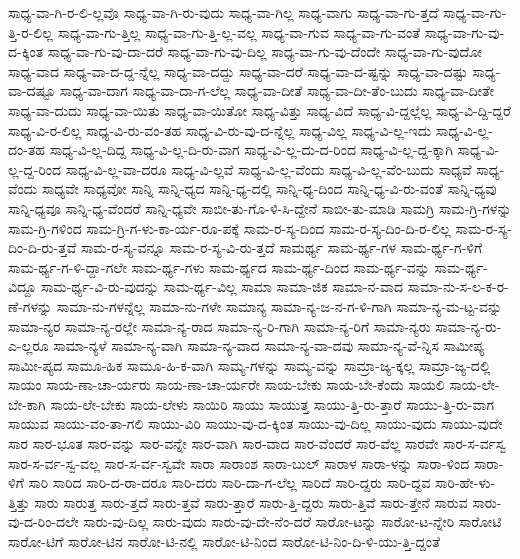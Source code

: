 {ಸಾಧ್ಯ-ವಾ-ಗಿ-ರ-ಲಿ-ಲ್ಲವೊ
ಸಾಧ್ಯ-ವಾ-ಗಿ-ರು-ವುದು
ಸಾಧ್ಯ-ವಾ-ಗಿಲ್ಲ
ಸಾಧ್ಯ-ವಾಗು
ಸಾಧ್ಯ-ವಾ-ಗು-ತ್ತದೆ
ಸಾಧ್ಯ-ವಾ-ಗು-ತ್ತಿ-ರ-ಲಿಲ್ಲ
ಸಾಧ್ಯ-ವಾ-ಗು-ತ್ತಿಲ್ಲ
ಸಾಧ್ಯ-ವಾ-ಗು-ತ್ತಿ-ಲ್ಲ-ವಲ್ಲ
ಸಾಧ್ಯ-ವಾ-ಗುವ
ಸಾಧ್ಯ-ವಾ-ಗು-ವಂತೆ
ಸಾಧ್ಯ-ವಾ-ಗು-ವು-ದ-ಕ್ಕಿಂತ
ಸಾಧ್ಯ-ವಾ-ಗು-ವು-ದಾ-ದರೆ
ಸಾಧ್ಯ-ವಾ-ಗು-ವು-ದಿಲ್ಲ
ಸಾಧ್ಯ-ವಾ-ಗು-ವು-ದೆಂದೇ
ಸಾಧ್ಯ-ವಾ-ಗು-ವುದೋ
ಸಾಧ್ಯ-ವಾದ
ಸಾಧ್ಯ-ವಾ-ದ-ದ್ದ-ನ್ನೆಲ್ಲ
ಸಾಧ್ಯ-ವಾ-ದದ್ದು
ಸಾಧ್ಯ-ವಾ-ದರೆ
ಸಾಧ್ಯ-ವಾ-ದ-ಷ್ಟನ್ನು
ಸಾಧ್ಯ-ವಾ-ದಷ್ಟು
ಸಾಧ್ಯ-ವಾ-ದಷ್ಟೂ
ಸಾಧ್ಯ-ವಾ-ದಾಗ
ಸಾಧ್ಯ-ವಾ-ದಾ-ಗ-ಲೆಲ್ಲ
ಸಾಧ್ಯ-ವಾ-ದೀತೆ
ಸಾಧ್ಯ-ವಾ-ದೀ-ತೆಂ-ಬುದು
ಸಾಧ್ಯ-ವಾ-ದೀತೇ
ಸಾಧ್ಯ-ವಾ-ದುದು
ಸಾಧ್ಯ-ವಾ-ಯಿತು
ಸಾಧ್ಯ-ವಾ-ಯಿತೋ
ಸಾಧ್ಯ-ವಿತ್ತು
ಸಾಧ್ಯ-ವಿದೆ
ಸಾಧ್ಯ-ವಿ-ದ್ದಲ್ಲೆಲ್ಲ
ಸಾಧ್ಯ-ವಿ-ದ್ದಿ-ದ್ದರೆ
ಸಾಧ್ಯ-ವಿ-ರ-ಲಿಲ್ಲ
ಸಾಧ್ಯ-ವಿ-ರು-ವಂ-ತಹ
ಸಾಧ್ಯ-ವಿ-ರು-ವು-ದ-ನ್ನೆಲ್ಲ
ಸಾಧ್ಯ-ವಿಲ್ಲ
ಸಾಧ್ಯ-ವಿ-ಲ್ಲ-ಇದು
ಸಾಧ್ಯ-ವಿ-ಲ್ಲ-ದಂ-ತಹ
ಸಾಧ್ಯ-ವಿ-ಲ್ಲ-ದಿದ್ದ
ಸಾಧ್ಯ-ವಿ-ಲ್ಲ-ದಿ-ರು-ವಾಗ
ಸಾಧ್ಯ-ವಿ-ಲ್ಲ-ದು-ದ-ರಿಂದ
ಸಾಧ್ಯ-ವಿ-ಲ್ಲ-ದ್ದ-ಕ್ಕಾಗಿ
ಸಾಧ್ಯ-ವಿ-ಲ್ಲ-ದ್ದ-ರಿಂದ
ಸಾಧ್ಯ-ವಿ-ಲ್ಲ-ವಾ-ದರೂ
ಸಾಧ್ಯ-ವಿ-ಲ್ಲವೆ
ಸಾಧ್ಯ-ವಿ-ಲ್ಲ-ವೆಂದು
ಸಾಧ್ಯ-ವಿ-ಲ್ಲ-ವೆಂ-ಬುದು
ಸಾಧ್ಯವೆ
ಸಾಧ್ಯ-ವೆಂದು
ಸಾಧ್ಯವೇ
ಸಾಧ್ಯವೋ
ಸಾನ್ನಿ
ಸಾನ್ನಿ-ಧ್ಯದ
ಸಾನ್ನಿ-ಧ್ಯ-ದಲ್ಲಿ
ಸಾನ್ನಿ-ಧ್ಯ-ದಿಂದ
ಸಾನ್ನಿ-ಧ್ಯ-ವಿ-ರು-ವಂತೆ
ಸಾನ್ನಿ-ಧ್ಯವು
ಸಾನ್ನಿ-ಧ್ಯವೂ
ಸಾನ್ನಿ-ಧ್ಯ-ವೆಂದರೆ
ಸಾನ್ನಿ-ಧ್ಯವೇ
ಸಾಬೀ-ತು-ಗೊ-ಳಿ-ಸಿ-ದ್ದೇನೆ
ಸಾಬೀ-ತು-ಮಾಡಿ
ಸಾಮಗ್ರಿ
ಸಾಮ-ಗ್ರಿ-ಗಳನ್ನು
ಸಾಮ-ಗ್ರಿ-ಗಳಿಂದ
ಸಾಮ-ಗ್ರಿ-ಗ-ಳು-ಕಾ-ರ್ಯ-ರೂ-ಪಕ್ಕೆ
ಸಾಮ-ರ-ಸ್ಯ-ದಿಂದ
ಸಾಮ-ರ-ಸ್ಯ-ದಿಂ-ದಿ-ರ-ಲಿಲ್ಲ
ಸಾಮ-ರ-ಸ್ಯ-ದಿಂ-ದಿ-ರು-ತ್ತವೆ
ಸಾಮ-ರ-ಸ್ಯ-ವನ್ನೂ
ಸಾಮ-ರ-ಸ್ಯ-ವಿ-ರು-ತ್ತದೆ
ಸಾಮರ್ಥ್ಯ
ಸಾಮ-ರ್ಥ್ಯ-ಗಳ
ಸಾಮ-ರ್ಥ್ಯ-ಗ-ಳಿಗೆ
ಸಾಮ-ರ್ಥ್ಯ-ಗ-ಳಿ-ದ್ದಾ-ಗಲೇ
ಸಾಮ-ರ್ಥ್ಯ-ಗಳು
ಸಾಮ-ರ್ಥ್ಯದ
ಸಾಮ-ರ್ಥ್ಯ-ದಿಂದ
ಸಾಮ-ರ್ಥ್ಯ-ವನ್ನು
ಸಾಮ-ರ್ಥ್ಯ-ವಿದ್ದೂ
ಸಾಮ-ರ್ಥ್ಯ-ವಿ-ರು-ವುದನ್ನು
ಸಾಮ-ರ್ಥ್ಯ-ವಿಲ್ಲ
ಸಾಮಾ
ಸಾಮಾ-ಜಿಕ
ಸಾಮಾ-ನ-ವಾದ
ಸಾಮಾ-ನು-ಸ-ಲ-ಕ-ರ-ಣೆ-ಗಳನ್ನು
ಸಾಮಾ-ನು-ಗಳನ್ನೆಲ್ಲ
ಸಾಮಾ-ನು-ಗಳೇ
ಸಾಮಾನ್ಯ
ಸಾಮಾ-ನ್ಯ-ಜ-ನ-ಗ-ಳಿ-ಗಾಗಿ
ಸಾಮಾ-ನ್ಯ-ಮ-ಟ್ಟ-ವನ್ನು
ಸಾಮಾ-ನ್ಯರ
ಸಾಮಾ-ನ್ಯ-ರಲ್ಲೇ
ಸಾಮಾ-ನ್ಯ-ರಾದ
ಸಾಮಾ-ನ್ಯ-ರಿ-ಗಾಗಿ
ಸಾಮಾ-ನ್ಯ-ರಿಗೆ
ಸಾಮಾ-ನ್ಯರು
ಸಾಮಾ-ನ್ಯ-ರು-ಎ-ಲ್ಲರೂ
ಸಾಮಾ-ನ್ಯಳೆ
ಸಾಮಾ-ನ್ಯ-ವಾಗಿ
ಸಾಮಾ-ನ್ಯ-ವಾದ
ಸಾಮಾ-ನ್ಯ-ವಾ-ದವು
ಸಾಮಾ-ನ್ಯ-ವೆ-ನ್ನಿಸ
ಸಾಮೀಪ್ಯ
ಸಾಮೀ-ಪ್ಯದ
ಸಾಮೂ-ಹಿಕ
ಸಾಮೂ-ಹಿ-ಕ-ವಾಗಿ
ಸಾಮ್ಯ-ಗಳನ್ನು
ಸಾಮ್ಯ-ವನ್ನು
ಸಾಮ್ರಾ-ಜ್ಯ-ಕ್ಕಲ್ಲ
ಸಾಮ್ರಾ-ಜ್ಯ-ದಲ್ಲಿ
ಸಾಯಂ
ಸಾಯ-ಣಾ-ಚಾ-ರ್ಯರು
ಸಾಯ-ಣಾ-ಚಾ-ರ್ಯರೇ
ಸಾಯ-ಬೇಕು
ಸಾಯ-ಬೇ-ಕೆಂದು
ಸಾಯಲಿ
ಸಾಯ-ಲೇ-ಬೇ-ಕಾಗಿ
ಸಾಯ-ಲೇ-ಬೇಕು
ಸಾಯ-ಲೇಳು
ಸಾಯಿರಿ
ಸಾಯು
ಸಾಯುತ್ತ
ಸಾಯು-ತ್ತಿ-ರು-ತ್ತಾರೆ
ಸಾಯು-ತ್ತಿ-ರು-ವಾಗ
ಸಾಯುವ
ಸಾಯು-ವಂ-ತಾ-ಗಲಿ
ಸಾಯು-ವಿರಿ
ಸಾಯು-ವು-ದ-ಕ್ಕಿಂತ
ಸಾಯು-ವು-ದಿಲ್ಲ
ಸಾಯು-ವುದು
ಸಾಯು-ವುದೇ
ಸಾರ
ಸಾರ-ಭೂತ
ಸಾರ-ವನ್ನು
ಸಾರ-ವನ್ನೇ
ಸಾರ-ವಾಗಿ
ಸಾರ-ವಾದ
ಸಾರ-ವೆಂದರೆ
ಸಾರ-ವೆಲ್ಲ
ಸಾರವೇ
ಸಾರ-ಸ-ರ್ವಸ್ವ
ಸಾರ-ಸ-ರ್ವ-ಸ್ವ-ವಲ್ಲ
ಸಾರ-ಸ-ರ್ವ-ಸ್ವವೇ
ಸಾರಾ
ಸಾರಾಂಶ
ಸಾರಾ-ಬುಲ್
ಸಾರಾಳ
ಸಾರಾ-ಳನ್ನು
ಸಾರಾ-ಳಿಂದ
ಸಾರಾ-ಳಿಗೆ
ಸಾರಿ
ಸಾರಿದ
ಸಾರಿ-ದ-ರಾ-ದರೂ
ಸಾರಿ-ದರು
ಸಾರಿ-ದಾ-ಗ-ಲೆಲ್ಲ
ಸಾರಿದೆ
ಸಾರಿ-ದ್ದರು
ಸಾರಿ-ದ್ದವ
ಸಾರಿ-ಹೇ-ಳು-ತ್ತಿತ್ತು
ಸಾರು
ಸಾರುತ್ತ
ಸಾರು-ತ್ತದೆ
ಸಾರು-ತ್ತವೆ
ಸಾರು-ತ್ತಾರೆ
ಸಾರು-ತ್ತಿ-ದ್ದರು
ಸಾರು-ತ್ತಿವೆ
ಸಾರು-ತ್ತೇನೆ
ಸಾರುವ
ಸಾರು-ವು-ದ-ರಿಂ-ದಲೇ
ಸಾರು-ವು-ದಿಲ್ಲ
ಸಾರು-ವುದು
ಸಾರು-ವು-ದೇ-ನೆಂ-ದರೆ
ಸಾರೋ-ಟನ್ನು
ಸಾರೋ-ಟ-ನ್ನೇರಿ
ಸಾರೋಟಿ
ಸಾರೋ-ಟಿಗೆ
ಸಾರೋ-ಟಿನ
ಸಾರೋ-ಟಿ-ನಲ್ಲಿ
ಸಾರೋ-ಟಿ-ನಿಂದ
ಸಾರೋ-ಟಿ-ನಿಂ-ದಿ-ಳಿ-ಯು-ತ್ತಿ-ದ್ದಂತೆ
}
